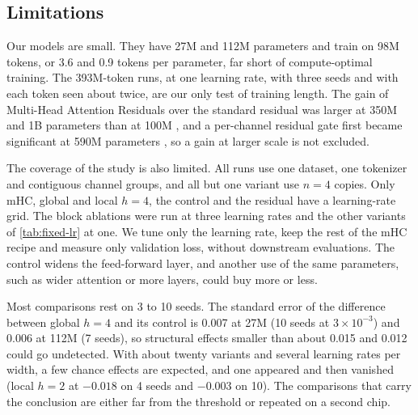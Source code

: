 \documentclass[11pt, a4paper]{article}
\newcommand{\lr}[1]{\ensuremath{#1 \times 10^{-3}}}
\begin{document}
\subsection{Limitations}
\label{sec:limitations}

Our models are small. They have 27M and 112M parameters and train on 98M tokens, or 3.6 and 0.9 tokens per parameter, far short
of compute-optimal training. The 393M-token runs, at one learning rate, with three seeds and with each
token seen about twice, are our only test of training length. The gain of Multi-Head Attention Residuals over the standard
residual was larger at 350M and 1B parameters than at 100M \citep{luo2026mhar}, and a per-channel residual gate first became
significant at 590M parameters \citep{kramer2026reviewresiduals}, so a gain at larger scale is not excluded.

The coverage of the study is also limited. All runs use one dataset, one tokenizer and contiguous channel groups, and all but
one variant use $n = 4$ copies. Only mHC, global and local $h = 4$, the control and the residual have a learning-rate grid. The
block ablations were run at three learning rates and the other variants of \cref{tab:fixed-lr} at one. We tune only the learning
rate, keep the rest of the mHC recipe and measure only validation loss, without downstream evaluations. The control widens the
feed-forward layer, and another use of the same parameters, such as wider attention or more layers, could buy more or
less.

Most comparisons rest on 3 to 10 seeds. The standard error of the difference between global $h = 4$ and its control is 0.007 at
27M (10 seeds at \lr{3}) and 0.006 at 112M (7 seeds), so structural effects smaller than about 0.015 and 0.012 could go undetected. With about twenty
variants and several learning rates per width, a few chance effects are expected, and one appeared and then vanished (local $h = 2$
at $-0.018$ on 4 seeds and $-0.003$ on 10). The comparisons that carry the conclusion are either far from the threshold or repeated
on a second chip.
\end{document}
